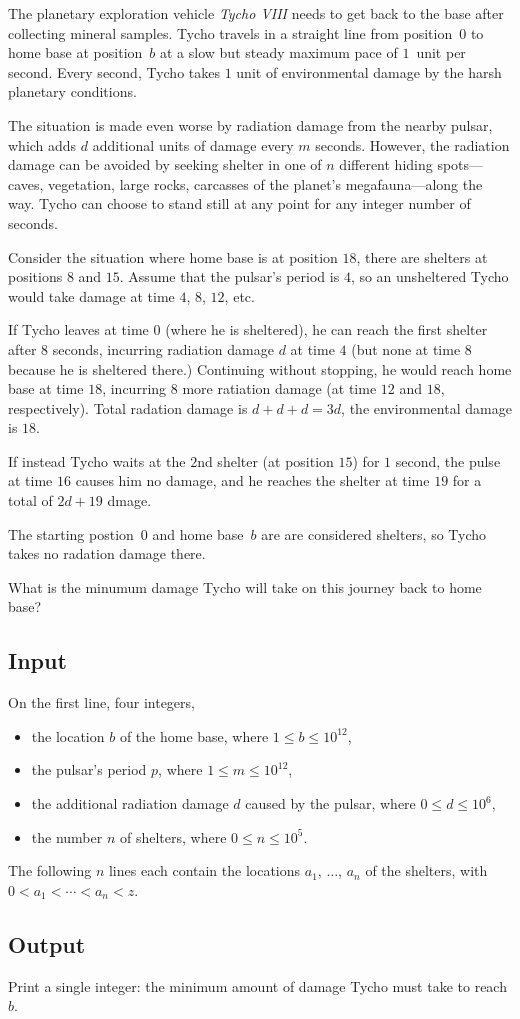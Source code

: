 
The planetary exploration vehicle \emph{Tycho VIII} needs to get back to the base after collecting mineral samples.
Tycho travels in a straight line from position~$0$ to home base at position~$b$ at a slow but steady maximum pace of $1$~unit per second.
Every second, Tycho takes $1$ unit of environmental damage by the harsh planetary conditions.

The situation is made even worse by radiation damage from the nearby pulsar, which adds $d$ additional units of damage every $m$ seconds.
However, the radiation damage can be avoided by seeking shelter in one of $n$ different hiding spots---caves, vegetation, large rocks, carcasses of the planet's megafauna---along the way.
Tycho can choose to stand still at any point for any integer number of seconds.

Consider the situation where home base is at position $18$, there are shelters at positions $8$ and $15$.
Assume that the pulsar's period is $4$, so an unsheltered Tycho would take damage at time $4$, $8$, $12$, etc.

If Tycho leaves at time $0$ (where he is sheltered), he can reach the first shelter after $8$ seconds, incurring radiation damage $d$ at time $4$ (but none at time $8$ because he is sheltered there.)
Continuing without stopping, he would reach home base at time $18$, incurring $8$ more ratiation damage (at time $12$ and $18$, respectively).
Total radation damage is $d+d+d=3d$, the environmental damage is $18$.

If instead Tycho waits at the $2$nd shelter (at position $15$) for $1$ second, the pulse at time $16$ causes him no damage, and he reaches the shelter at time $19$ for a total of $2d + 19$ dmage.

The starting postion~$0$ and home base~$b$ are are considered shelters, so Tycho takes no radation damage there.

\medskip
What is the minumum damage Tycho will take on this journey back to home base?

\subsection*{Input}

On the first line, four integers, 
\begin{itemize} 
\item the location $b$ of the home base, where $1\leq b \leq 10^{12}$,
\item the pulsar's period $p$, where $1\leq m \leq 10^{12}$,
\item the additional radiation damage $d$ caused by the pulsar, where $0\leq d\leq 10^6$,
\item the number $n$ of shelters, where $0\leq n\leq 10^5$.
\end{itemize}
The following $n$ lines each contain the locations $a_1$, $\ldots$, $a_n$ of the shelters, with $0<a_1< \cdots < a_n < z$.

\subsection*{Output}

Print a single integer: the minimum amount of damage Tycho must take to reach $b$.
